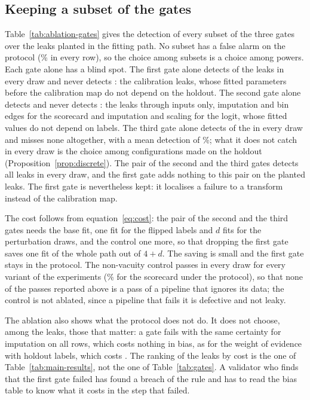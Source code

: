 

\subsection{Keeping a subset of the gates}

Table~\ref{tab:ablation-gates} gives the detection of every subset of the three gates over the  leaks planted in the fitting path. No subset has a false alarm on the protocol (\% in every row), so the choice among subsets is a choice among powers. Each gate alone has a blind spot. The first gate alone detects  of the  leaks in every draw and never detects : the calibration leaks, whose fitted parameters before the calibration map do not depend on the holdout. The second gate alone detects  and never detects : the leaks through inputs only, imputation and bin edges for the scorecard and imputation and scaling for the logit, whose fitted values do not depend on labels. The third gate alone detects  of the  in every draw and misses none altogether, with a mean detection of \%; what it does not catch in every draw is the choice among configurations made on the holdout (Proposition~\ref{prop:discrete}). The pair of the second and the third gates detects all  leaks in every draw, and the first gate adds nothing to this pair on the planted leaks. The first gate is nevertheless kept: it localises a failure to a transform instead of the calibration map.



The cost follows from equation~\eqref{eq:cost}: the pair of the second and the third gates needs the base fit, one fit for the flipped labels and $d$ fits for the perturbation draws, and the control one more, so that dropping the first gate saves one fit of the whole path out of $4+d$. The saving is small and the first gate stays in the protocol. The non-vacuity control passes in every draw for every variant of the experiments (\% for the scorecard under the protocol), so that none of the passes reported above is a pass of a pipeline that ignores its data; the control is not ablated, since a pipeline that fails it is defective and not leaky.

The ablation also shows what the protocol does not do. It does not choose, among the leaks, those that matter: a gate fails with the same certainty for imputation on all rows, which costs nothing in bias, as for the weight of evidence with holdout labels, which costs . The ranking of the leaks by cost is the one of Table~\ref{tab:main-results}, not the one of Table~\ref{tab:gates}. A validator who finds that the first gate failed has found a breach of the rule and has to read the bias table to know what it costs in the step that failed.
